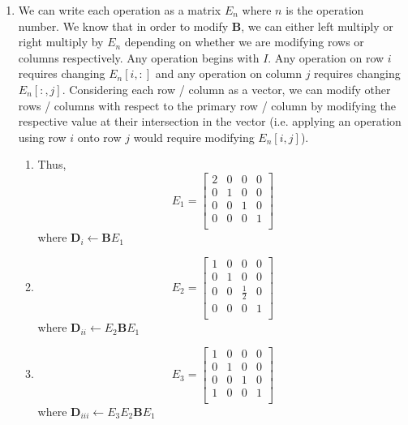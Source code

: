 \documentclass[11pt,letterpaper]{article}
\begin{document}
\begin{enumerate}
\begin{enumerate}
    \item We can write each operation as a matrix $E_n$ where $n$ is the operation
    number. We know that in order to modify $\mathbf{B}$, we can either left multiply 
    or right multiply by $E_n$ depending on whether we are modifying rows or columns
    respectively. Any operation begins with $I$. Any operation on row $i$ requires
    changing $E_n[i, :]$ and any operation on column $j$ requires changing
    $E_n[:, j]$. Considering each row / column as a vector, we can modify other
    rows / columns with respect to the primary row / column by modifying the 
    respective value at their intersection in the vector (i.e. applying an operation
    using row $i$ onto row $j$ would require modifying $E_n[i, j]$).
    \begin{enumerate}[label=(\roman*),align=left]
        \item Thus,
        \[
            E_1 = \begin{bmatrix}
                2 & 0 & 0 & 0\\
                0 & 1 & 0 & 0\\
                0 & 0 & 1 & 0\\
                0 & 0 & 0 & 1\\
            \end{bmatrix}
        \]
        where $\mathbf{D}_i \leftarrow \mathbf{B}E_1$
        \item \[
            E_2 = \begin{bmatrix}
                1 & 0 & 0 & 0\\
                0 & 1 & 0 & 0\\
                0 & 0 & \frac{1}{2} & 0\\
                0 & 0 & 0 & 1\\
            \end{bmatrix}
        \]
        where $\mathbf{D}_{ii} \leftarrow E_2\mathbf{B}E_1$
        \item \[
            E_3 = \begin{bmatrix}
                1 & 0 & 0 & 0\\
                0 & 1 & 0 & 0\\
                0 & 0 & 1 & 0\\
                1 & 0 & 0 & 1\\
            \end{bmatrix}
        \]
        where $\mathbf{D}_{iii} \leftarrow E_3E_2\mathbf{B}E_1$

\end{enumerate}
\end{enumerate}
\end{enumerate}
\end{document}
